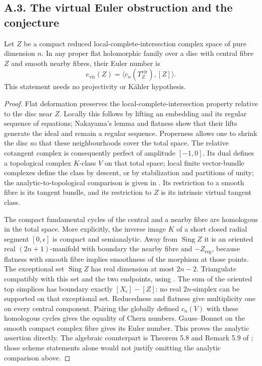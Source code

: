 

\subsection{A.3. The virtual Euler obstruction and the conjecture}

\begin{lemma}[A.3.1; Proved]\label{push:A31}
Let $Z$ be a compact reduced local-complete-intersection complex
space of pure dimension $n$. In any proper flat holomorphic
family over a disc with central fibre $Z$ and smooth nearby
fibres, their Euler number is
\[
 e_{\mathrm{vir}}(Z)=\langle c_n(T_Z^{\mathrm{vir}}),[Z]\rangle.
\]
This statement needs no projectivity or K\"ahler hypothesis.
\end{lemma}
\begin{proof}
Flat deformation preserves the local-complete-intersection
property relative to the disc near $Z$. Locally this follows by
lifting an embedding and its regular sequence of equations;
Nakayama's lemma and flatness show that their lifts generate
the ideal and remain a regular sequence. Properness allows one
to shrink the disc so that these neighbourhoods cover the total
space. The relative cotangent complex is consequently perfect
of amplitude $[-1,0]$. Its dual defines a topological complex
$K$-class $V$ on that total space; local finite vector-bundle
complexes define the class by descent, or by stabilization and
partitions of unity; the analytic-to-topological comparison is
given in \cite[Lemmas 3.1--3.2 and Section 3.1]{Levy08}.
Its restriction to a smooth fibre is its
tangent bundle, and its restriction to $Z$ is its intrinsic
virtual tangent class.

The compact fundamental cycles of the central and a nearby
fibre are homologous in the total space. More explicitly,
the inverse image $K$ of a short closed radial segment
$[0,\epsilon]$ is compact and semianalytic. Away from
$\operatorname{Sing}Z$ it is an oriented real
$(2n+1)$-manifold with boundary the nearby fibre and
$-Z_{\mathrm{reg}}$, because flatness with smooth fibre
implies smoothness of the morphism at those points.
The exceptional set $\operatorname{Sing}Z$ has real
dimension at most $2n-2$. Triangulate compatibly with
this set and the two endpoints, using
\cite[Section 3, Theorems 1--2]{Loj64}. The sum of the
oriented top simplices has boundary exactly
$[X_\epsilon]-[Z]$: no real $2n$-simplex can be supported
on that exceptional set. Reducedness and flatness give
multiplicity one on every central component. Pairing the globally defined
$c_n(V)$ with these homologous cycles gives the equality of
Chern numbers. Gauss--Bonnet on the smooth compact complex
fibre gives its Euler number. This proves the analytic assertion
directly. The algebraic counterpart is Theorem 5.8 and
Remark 5.9 of \cite{FG10}; those scheme statements alone would
not justify omitting the analytic comparison above.
\end{proof}

